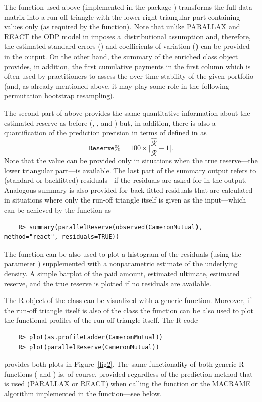 The function  used above (implemented in the package ) 
transforms the full data matrix  into a run-off triangle with the lower-right triangular part containing   values only (as required by the  function). Note that unlike PARALLAX and REACT the ODP model in  imposes a~distributional assumption and, therefore, the estimated standard errors () and coefficients of variation () can be provided in the output. On the other hand, the summary of the enriched  class object provides, in addition,  the first cumulative payments in the first column which is often used by practitioners to assess
the over-time stability of the given portfolio (and, as already mentioned above, it may play some role in the following permutation bootstrap resampling). 

The second part of  above provides the same quantitative information about the estimated reserve as before (, ,  and ) but, in addition, there is also a quantification of the prediction precision in terms of  defined in \cite{MMP2022}
as 
$$\texttt{Reserve\%} = 100 \times \Big| \frac{\widehat{\mathcal{R}}}{\mathcal{R}} - 1 \Big|.$$ 
Note that the value can be provided only in situations when the true reserve---the lower triangular part---is available. The last part of the summary output refers to (standard or backfitted) residuals---if the residuals are asked for in the output. Analogous summary is also provided for back-fitted residuals that are calculated in situations where only the run-off triangle itself is given as the input---which can be achieved by the  function as
\begin{verbatim}
    R> summary(parallelReserve(observed(CameronMutual), method="react", residuals=TRUE))
\end{verbatim}

The  function can be also used to plot a  histogram of the residuals (using the parameter ) supplemented with a nonparametric estimate of the underlying density. A simple barplot of the paid amount, estimated ultimate, estimated reserve, and the true  reserve is plotted if no residuals are available. 

The R object of the class  can be  visualized with a generic  function. Moreover, if the run-off triangle itself is also of the class  the  function can be also used to plot the functional profiles of the run-off triangle itself. The R code
\begin{verbatim}
    R> plot(as.profileLadder(CameronMutual))
    R> plot(parallelReserve(CameronMutual))
\end{verbatim}
provides both plots in Figure~\ref{fig2}.  The same functionality of both generic R functions ( and ) is, of course, provided regardless of the prediction method that is used (PARALLAX or REACT) 
when calling the  function or the MACRAME algorithm implemented in the  function---see below. 

